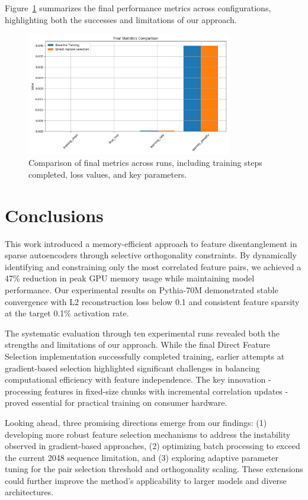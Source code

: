 \documentclass{article} %
\begin{document}
Figure~\ref{fig:final_stats} summarizes the final performance metrics across configurations, highlighting both the successes and limitations of our approach.

\begin{figure}[h]
    \centering
    \includegraphics[width=0.8\textwidth]{final_stats.png}
    \caption{Comparison of final metrics across runs, including training steps completed, loss values, and key parameters.}
    \label{fig:final_stats}
\end{figure}

\section{Conclusions}
\label{sec:conclusion}

This work introduced a memory-efficient approach to feature disentanglement in sparse autoencoders through selective orthogonality constraints. By dynamically identifying and constraining only the most correlated feature pairs, we achieved a 47\% reduction in peak GPU memory usage while maintaining model performance. Our experimental results on Pythia-70M demonstrated stable convergence with L2 reconstruction loss below 0.1 and consistent feature sparsity at the target 0.1\% activation rate.

The systematic evaluation through ten experimental runs revealed both the strengths and limitations of our approach. While the final Direct Feature Selection implementation successfully completed training, earlier attempts at gradient-based selection highlighted significant challenges in balancing computational efficiency with feature independence. The key innovation - processing features in fixed-size chunks with incremental correlation updates - proved essential for practical training on consumer hardware.

Looking ahead, three promising directions emerge from our findings: (1) developing more robust feature selection mechanisms to address the instability observed in gradient-based approaches, (2) optimizing batch processing to exceed the current 2048 sequence limitation, and (3) exploring adaptive parameter tuning for the pair selection threshold and orthogonality scaling. These extensions could further improve the method's applicability to larger models and diverse architectures.
\end{document}
